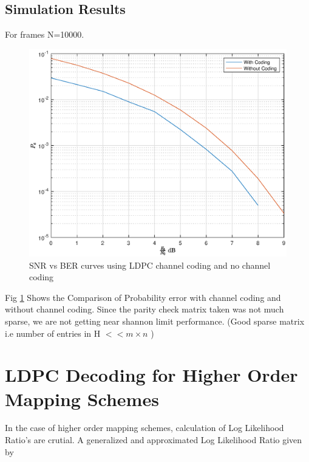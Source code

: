 \documentclass[journal,12pt,twocolumn]{IEEEtran}
\begin{document}
\subsection{Simulation Results}
For frames N=10000.
 \begin{figure}[!ht]
\begin{center}
\includegraphics[width=\columnwidth]{./figs/ber}
\caption{SNR vs BER curves using LDPC channel coding and no channel coding}
\label{fig : ber}
\end{center}
\end{figure}
Fig \ref{fig : ber} Shows the Comparison of Probability error with channel coding and without channel coding. Since the parity check matrix taken was not much sparse, we are not getting near shannon limit performance. (Good sparse matrix i.e number of entries in H $<< m\times n $ )

\section{LDPC Decoding for Higher Order Mapping Schemes}
In the case of higher order mapping schemes, calculation of Log Likelihood Ratio's are crutial. A generalized and approximated Log Likelihood Ratio given by \cite{llr}
\end{document}
